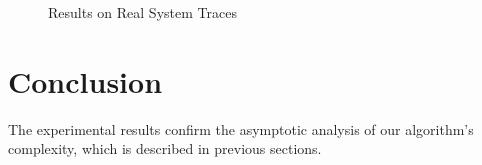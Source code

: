 \documentclass[]{sigplanconf}
\begin{document}
\begin{figure}[ht]
  \centering
  \caption{Results on Real System Traces}\label{Algs_real}
\end{figure}

\section{Conclusion}

The experimental results confirm the asymptotic analysis of our algorithm's complexity, which is described in previous sections.


%


\end{document}
